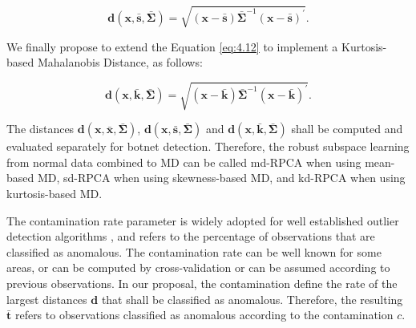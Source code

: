 \begin{equation}\label{eq:4.13}
	\boldsymbol{d}(\boldsymbol{x}, \bar{\boldsymbol{s}}, \boldsymbol{\bar{\Sigma}}) = \sqrt{(\boldsymbol{x} - \bar{\boldsymbol{s}}) \boldsymbol{\bar{\Sigma}}^{-1}(\boldsymbol{x} - \bar{\boldsymbol{s}})^\prime}.
\end{equation}

We finally propose to extend the Equation \ref{eq:4.12} to implement a Kurtosis-based Mahalanobis Distance, as follows:

\begin{equation}\label{eq:4.14}
	\boldsymbol{d}(\boldsymbol{x}, \bar{\boldsymbol{k}}, \boldsymbol{\bar{\Sigma}}) = \sqrt{(\boldsymbol{x} - \bar{\boldsymbol{k}}) \boldsymbol{\bar{\Sigma}}^{-1}(\boldsymbol{x} - \bar{\boldsymbol{k}})^\prime}.
\end{equation}

The distances $\boldsymbol{d}(\boldsymbol{x},\bar{\boldsymbol{x}}, \boldsymbol{\bar{\Sigma}})$, $\boldsymbol{d}(\boldsymbol{x}, \bar{\boldsymbol{s}}, \boldsymbol{\bar{\Sigma}})$ and $\boldsymbol{d}(\boldsymbol{x}, \bar{\boldsymbol{k}}, \boldsymbol{\bar{\Sigma}})$ shall be computed and evaluated separately for botnet detection. Therefore, the robust subspace learning from normal data combined to MD can be called md-RPCA when using mean-based MD, sd-RPCA when using skewness-based MD, and kd-RPCA when using kurtosis-based MD.

The contamination rate parameter is widely adopted for well established outlier detection algorithms \cite{zhao2019pyod}, and refers to the percentage of observations that are classified as anomalous. The contamination rate can be well known for some areas, or can be computed by cross-validation or can be assumed according to previous observations. In our proposal, the contamination define the rate of the largest distances $\boldsymbol{d}$ that shall be classified as anomalous. Therefore, the resulting $\boldsymbol{\bar{t}}$ refers to observations classified as anomalous according to the contamination $c$.

